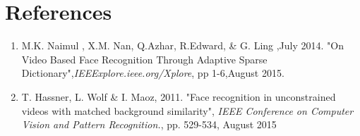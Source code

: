 \documentclass[12pt]{article}
\begin{document}
\section{References}
\begin{enumerate}
\item M.K. Naimul , X.M. Nan, Q.Azhar, R.Edward, \& G. Ling ,July 2014. "On Video Based Face Recognition Through Adaptive Sparse Dictionary",\textit{IEEExplore.ieee.org/Xplore}, pp 1-6,August 2015.
\item T. Hassner, L. Wolf \& I. Maoz, 2011. "Face recognition in unconstrained videos with matched background similarity", \textit{IEEE Conference on Computer Vision and Pattern Recognition.}, pp. 529-534, August 2015
\end{enumerate}
\end{document}
